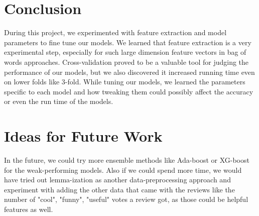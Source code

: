 \documentclass{article}
\begin{document}
\section{Conclusion}
During this project, we experimented with feature extraction and model parameters to fine tune our models. We learned that feature extraction is a very experimental step, especially for such large dimension feature vectors in bag of words approaches. Cross-validation proved to be a valuable tool for judging the performance of our models, but we also discovered it increased running time even on lower folds like 3-fold. While tuning our models, we learned the parameters specific to each model and how tweaking them could possibly affect the accuracy or even the run time of the models. 

\section{Ideas for Future Work}
In the future, we could try more ensemble methods like Ada-boost or XG-boost for the weak-performing models. Also if we could spend more time, we would have tried out lemma-ization as another data-preprocessing approach and experiment with adding the other data that came with the reviews like the number of "cool", "funny", "useful" votes a review got, as those could be helpful features as well.
\end{document}
